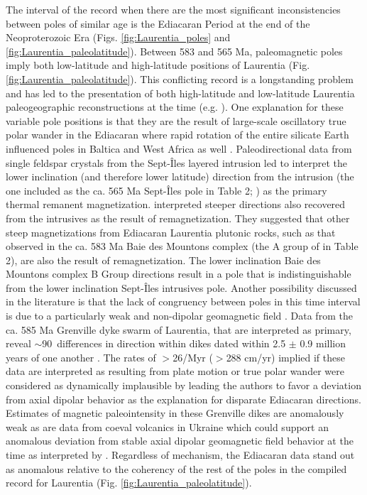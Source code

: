 \documentclass[twocolumn, switch]{article} %
\begin{document}
The interval of the record when there are the most significant inconsistencies between poles of similar age is the Ediacaran Period at the end of the Neoproterozoic Era (Figs. \ref{fig:Laurentia_poles} and \ref{fig:Laurentia_paleolatitude}).  Between 583 and 565 Ma, paleomagnetic poles imply both low-latitude and high-latitude positions of Laurentia  (Fig. \ref{fig:Laurentia_paleolatitude}). This conflicting record is a longstanding problem and has led to the presentation of both high-latitude and low-latitude Laurentia paleogeographic reconstructions at the time (e.g. \citealp{Pisarevsky2001a,Li2008a}). One explanation for these variable pole positions is that they are the result of large-scale oscillatory true polar wander in the Ediacaran where rapid rotation of the entire silicate Earth influenced poles in Baltica and West Africa as well \citep{McCausland2007a, Robert2017a}. Paleodirectional data from single feldspar crystals from the Sept-\^Iles layered intrusion led \cite{Bono2015a} to interpret the lower inclination (and therefore lower latitude) direction from the intrusion (the one included as the ca. 565 Ma Sept-\^Iles pole in Table 2; \citealp{Tanczyk1987a}) as the primary thermal remanent magnetization.  \cite{Bono2015a} interpreted steeper directions also recovered from the intrusives as the result of remagnetization. They suggested that other steep magnetizations from Ediacaran Laurentia plutonic rocks, such as that observed in the ca. 583 Ma Baie des Mountons complex (the A group of \cite{McCausland2011a} in Table 2), are also the result of remagnetization. The lower inclination Baie des Mountons complex B Group directions result in a pole that is indistinguishable from the lower inclination  Sept-\^Iles intrusives pole. Another possibility discussed in the literature is that the lack of congruency between poles in this time interval is due to a particularly weak and non-dipolar geomagnetic field \citep{Abrajevitch2010a, Halls2015a, Bono2019a}. Data from the ca. 585 Ma Grenville dyke swarm of Laurentia, that are interpreted as primary, reveal $\sim$90\textdegree\ differences in direction within dikes dated within 2.5 $\pm$ 0.9 million years of one another \citep{Halls2015a}. The rates of $>$26\textdegree /Myr ($>$288 cm/yr) implied if these data are interpreted as resulting from plate motion or true polar wander were considered as dynamically implausible by \cite{Halls2015a} leading the authors to favor a deviation from axial dipolar behavior as the explanation for disparate Ediacaran directions. Estimates of magnetic paleointensity in these Grenville dikes are anomalously weak \citep{Thallner2020a} as are data from coeval volcanics in Ukraine \citep{Shcherbakova2019a} which could support an anomalous deviation from stable axial dipolar geomagnetic field behavior at the time as interpreted by \cite{Halls2015a}.  Regardless of mechanism, the Ediacaran data stand out as anomalous relative to the coherency of the rest of the poles in the compiled record for Laurentia (Fig. \ref{fig:Laurentia_paleolatitude}). 
\end{document}
